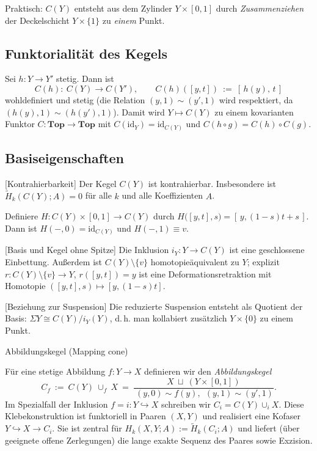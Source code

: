 \documentclass[10pt, letterpaper]{article}
\begin{document}
Praktisch: $C(Y)$ entsteht aus dem Zylinder $Y\times[0,1]$ durch \emph{Zusammenziehen} der Deckelschicht $Y\times\{1\}$ zu \emph{einem} Punkt.

\subsection{Funktorialität des Kegels}
Sei $h:Y\to Y'$ stetig. Dann ist
\[
  C(h):\ C(Y)\longrightarrow C(Y'),\qquad C(h)([y,t])\ :=\ [\,h(y),\,t\,]
\]
wohldefiniert und stetig (die Relation $(y,1)\sim(y',1)$ wird respektiert, da $(h(y),1)\sim(h(y'),1)$).
Damit wird $Y\mapsto C(Y)$ zu einem kovarianten Funktor $C:\mathbf{Top}\to\mathbf{Top}$ mit
$C(\mathrm{id}_Y)=\mathrm{id}_{C(Y)}$ und $C(h\circ g)=C(h)\circ C(g)$.


\subsection{Basiseigenschaften}

[Kontrahierbarkeit]
Der Kegel $C(Y)$ ist kontrahierbar. Insbesondere ist $\widetilde H_k(C(Y);A)=0$ für alle $k$ und alle Koeffizienten $A$.



Definiere $H:C(Y)\times[0,1]\to C(Y)$ durch
$H\big([y,t],s\big)=[\,y,(1-s)t+s\,]$.
Dann ist $H(-,0)=\mathrm{id}_{C(Y)}$ und $H(-,1)\equiv v$.


[Basis und Kegel ohne Spitze]
Die Inklusion $i_Y:Y\to C(Y)$ ist eine geschlossene Einbettung. Außerdem ist $C(Y)\setminus\{v\}$ homotopieäquivalent zu $Y$; explizit
$r:C(Y)\setminus\{v\}\to Y$, $r([y,t])=y$
ist eine Deformationsretraktion mit Homotopie $([y,t],s)\mapsto [y,(1-s)t]$.


[Beziehung zur Suspension]
Die reduzierte Suspension entsteht als Quotient der Basis:
$\Sigma Y\cong C(Y)/i_Y(Y)$, d.\,h. man kollabiert zusätzlich $Y\times\{0\}$ zu einem Punkt.


Abbildungskegel (Mapping cone)

Für eine stetige Abbildung $f:Y\to X$ definieren wir den \emph{Abbildungskegel}
\[
  C_f\ :=\ C(Y)\ \cup_f\ X\ =\ \frac{X\ \sqcup\ (Y\times[0,1])}{\ (y,0)\sim f(y),\ \ (y,1)\sim (y',1)}.
\]
Im Spezialfall der Inklusion $f=i:Y\hookrightarrow X$ schreiben wir $C_i=C(Y)\cup_i X$.
Diese Klebekonstruktion ist funktoriell in Paaren $(X,Y)$ und realisiert eine Kofaser $Y\hookrightarrow X\to C_i$.
Sie ist zentral für
$H_k(X,Y;A):=\widetilde H_k(C_i;A)$
und liefert (über geeignete offene Zerlegungen) die lange exakte Sequenz des Paares sowie Exzision.
\end{document}
